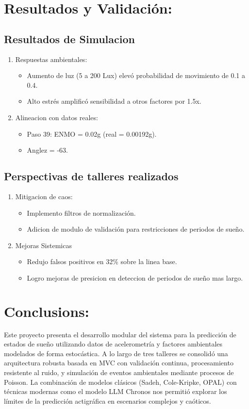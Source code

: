 \documentclass[conference]{IEEEtran}
\begin{document}
\section{Resultados y Validación: }
\subsection{Resultados de Simulacion}
\begin{enumerate}
    \item Respuestas ambientales:
        \begin{itemize}
        \item Aumento de luz (5 a 200 Lux) elevó probabilidad de movimiento de 0.1 a 0.4.
        \item Alto estrés amplificó sensibilidad a otros factores por 1.5x.
        \end{itemize}
    \item Alineacion con datos reales:
        \begin{itemize}
        \item Paso 39: ENMO = 0.02g (real = 0.00192g).
        \item Anglez = -63.
        \end{itemize}
\end{enumerate}
\subsection{Perspectivas de talleres realizados}
\begin{enumerate}
    \item Mitigacion de caos:
        \begin{itemize}
        \item Implemento filtros de normalización.
        \item Adicion de modulo de validación para restricciones de periodos de sueño.
        \end{itemize}
    \item Mejoras Sistemicas
        \begin{itemize}
        \item Redujo falsos positivos en 32\% sobre la linea base.
        \item Logro mejoras de presicion en deteccion de periodos de sueño mas largo.
        \end{itemize}
\end{enumerate}

\section{Conclusions: }
Este proyecto presenta el desarrollo modular del sistema para la predicción de estados de sueño utilizando datos de acelerometría y factores ambientales modelados de forma estocástica. A lo largo de tres talleres se consolidó una arquitectura robusta basada en MVC con validación continua, procesamiento resistente al ruido, y simulación de eventos ambientales mediante procesos de Poisson. La combinación de modelos clásicos (Sadeh, Cole-Kripke, OPAL) con técnicas modernas como el modelo LLM Chronos nos permitió explorar los límites de la predicción actigráfica en escenarios complejos y caóticos.
\end{document}
